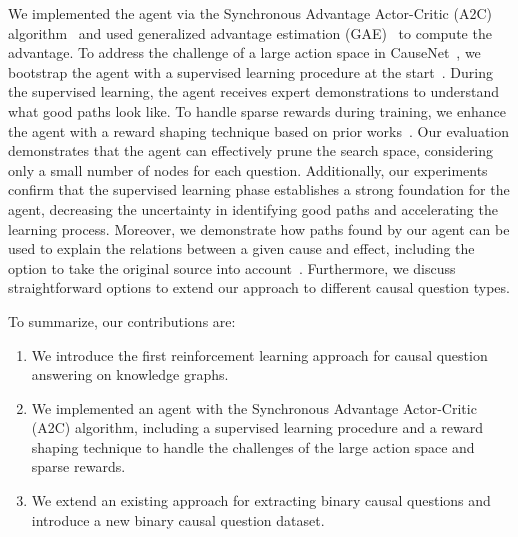 We implemented the agent via the Synchronous Advantage Actor-Critic (A2C) algorithm~\cite{Mnih2016A2C} and used 
generalized advantage estimation (GAE)~\cite{Schulman2016GAE} to compute the advantage. 
To address the challenge of a large action space in CauseNet~\cite{Heindorf2020Causenet}, we bootstrap the agent with a supervised learning procedure at the start~\cite{Xiong2017DeePpath}.
During the supervised learning, the agent receives expert demonstrations to understand what good paths look like.
To handle sparse rewards during training, we enhance 
the agent with a reward shaping technique based on prior works~\cite{Yasunaga2021QAGNN}.
Our evaluation demonstrates that the agent can effectively prune the search space, considering only a small number of nodes for each question. 
Additionally, our experiments confirm that the supervised learning phase establishes a strong foundation for the agent, decreasing the uncertainty in identifying good paths and accelerating the learning process. 
Moreover, we demonstrate how paths found by our agent can be used to explain the relations between a given cause and effect, including the option to take the original source into account~\cite{Heindorf2020Causenet}.
Furthermore, we discuss straightforward options to extend our approach to different causal question types.

To summarize, our contributions are:
\begin{enumerate}
    \item We introduce the first reinforcement learning approach for causal question answering on knowledge graphs.
    \item We implemented an agent with the Synchronous Advantage Actor-Critic (A2C) algorithm, including a supervised learning procedure and a 
        reward shaping technique to handle the challenges of the large action space and sparse rewards.
    \item We extend an existing approach for extracting binary causal questions and introduce a new binary causal question dataset.
\end{enumerate}


